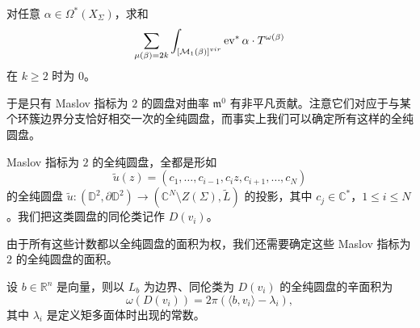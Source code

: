 
\begin{lemma*}
对任意 $\alpha\in\Omega^{\ast} (X_{\Sigma})$，求和
\[
  \sum_{\mu(\beta)=2k}\int_{\left[\mathcal{M}_1 (\beta)\right]^{vir}}\operatorname{ev}^{\ast}\alpha\cdot T^{\omega (\beta)}
\]
在 $k\geq 2$ 时为 $0$。
\end{lemma*}


于是只有 Maslov 指标为 $2$ 的圆盘对曲率 $\mathfrak{m}^0$ 有非平凡贡献。注意它们对应于与某个环簇边界分支恰好相交一次的全纯圆盘，而事实上我们可以确定所有这样的全纯圆盘。


\begin{lemma*}
Maslov 指标为 $2$ 的全纯圆盘，全都是形如
\[
  \tilde{u} (z)=(c_1,\dotsc, c_{i-1}, c_i z, c_{i+1},\dotsc, c_N)
\]
的全纯圆盘 $\tilde{u}\colon (\mathbb{D}^2,\partial\mathbb{D}^2)\to (\mathbb{C}^N\setminus Z(\Sigma),\tilde{L})$ 的投影，其中 $c_j\in\mathbb{C}^{\ast}$，$1\leq i\leq N$。我们把这类圆盘的同伦类记作 $D(v_i)$。
\end{lemma*}


由于所有这些计数都以全纯圆盘的面积为权，我们还需要确定这些 Maslov 指标为 $2$ 的全纯圆盘的面积。

\begin{lemma*}
设 $b\in\mathbb{R}^n$ 是向量，则以 $L_b$ 为边界、同伦类为 $D(v_i)$ 的全纯圆盘的辛面积为
\[
  \omega (D(v_i))=2\pi (\langle b,v_i\rangle -\lambda_i),
\]
其中 $\lambda_i$ 是定义矩多面体时出现的常数。
\end{lemma*}

